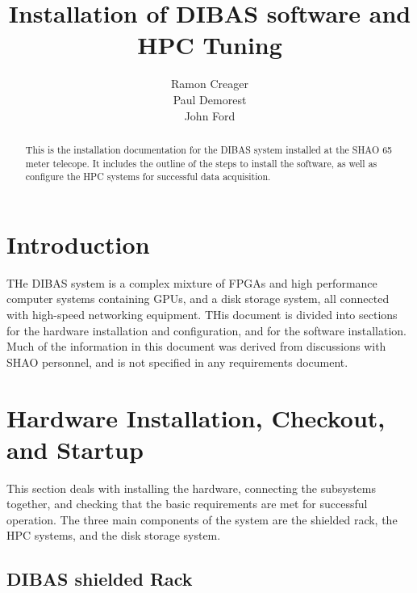 \documentclass[11pt]{article}
\begin{document}
\title{Installation of DIBAS software and HPC Tuning}
\author{Ramon Creager \\ Paul Demorest \\ John Ford }

\maketitle

\begin{abstract}
  This is the installation documentation for the DIBAS system
  installed at the SHAO 65 meter telecope.  It includes the outline of
  the steps to install the software, as well as configure the HPC
  systems for successful data acquisition.

\end{abstract}



\section{Introduction}

THe DIBAS system is a complex mixture of FPGAs and high performance
computer systems containing GPUs, and a disk storage system, all
connected with high-speed networking equipment.  THis document is
divided into sections for the hardware installation and configuration,
and for the software installation.  Much of the information in this
document was derived from discussions with SHAO personnel, and is not
specified in any requirements document.

\section{Hardware Installation, Checkout, and Startup}
This section deals with installing the hardware, connecting the
subsystems together, and checking that the basic requirements are met
for successful operation.  The three main components of the system are
the shielded rack, the HPC systems, and the disk storage system.

\subsection{DIBAS shielded Rack}
\end{document}
